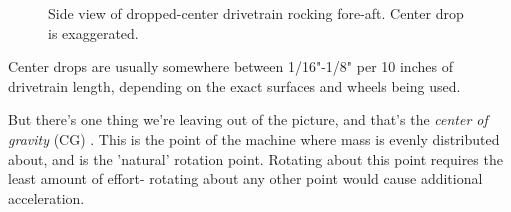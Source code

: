 \begin{figure}[H]
\begin{subfigure}[]{0.45\linewidth}
\end{subfigure}\begin{subfigure}[]{0.45\linewidth}
\end{subfigure}
\caption{Side view of dropped-center drivetrain rocking fore-aft. Center drop is exaggerated.}
\end{figure}

Center drops are usually somewhere between 1/16"-1/8" per 10 inches of drivetrain length, depending on the exact surfaces and wheels being used.

But there's one thing we're leaving out of the picture, and that's the \textit{center of gravity} (CG) . This is the point of the machine where mass is evenly distributed about, and is the 'natural' rotation point. Rotating about this point requires the least amount of effort- rotating  about any other point would cause additional acceleration.

